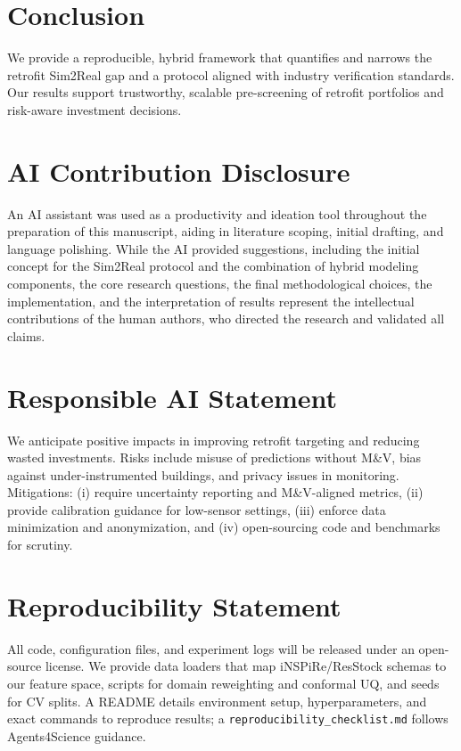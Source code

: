 ﻿\documentclass{article}
\begin{document}
\section{Conclusion}
We provide a reproducible, hybrid framework that quantifies and narrows the retrofit Sim2Real gap and a protocol aligned with industry verification standards.
Our results support trustworthy, scalable pre-screening of retrofit portfolios and risk-aware investment decisions.
\section*{AI Contribution Disclosure}
An AI assistant was used as a productivity and ideation tool throughout the preparation of this manuscript, aiding in literature scoping, initial drafting, and language polishing. While the AI provided suggestions, including the initial concept for the Sim2Real protocol and the combination of hybrid modeling components, the core research questions, the final methodological choices, the implementation, and the interpretation of results represent the intellectual contributions of the human authors, who directed the research and validated all claims.
\section*{Responsible AI Statement}
We anticipate positive impacts in improving retrofit targeting and reducing wasted investments.
Risks include misuse of predictions without M\&V, bias against under-instrumented buildings, and privacy issues in monitoring.
Mitigations: (i) require uncertainty reporting and M\&V-aligned metrics, (ii) provide calibration guidance for low-sensor settings, (iii) enforce data minimization and anonymization, and (iv) open-sourcing code and benchmarks for scrutiny.
\section*{Reproducibility Statement}
All code, configuration files, and experiment logs will be released under an open-source license.
We provide data loaders that map iNSPiRe/ResStock schemas to our feature space, scripts for domain reweighting and conformal UQ, and seeds for CV splits.
A README details environment setup, hyperparameters, and exact commands to reproduce results; a \texttt{reproducibility\_checklist.md} follows Agents4Science guidance.



\end{document}
